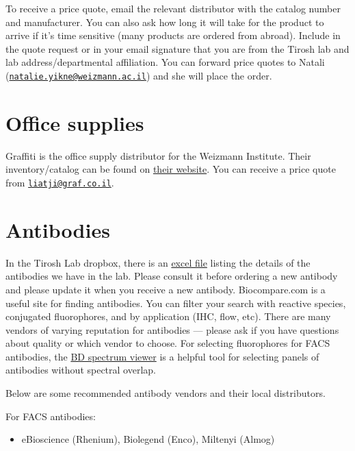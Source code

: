 \documentclass[]{book}
\providecommand{\tightlist}{%
  \setlength{\itemsep}{0pt}\setlength{\parskip}{0pt}}
\begin{document}
To receive a price quote, email the relevant distributor with the
catalog number and manufacturer. You can also ask how long it will take
for the product to arrive if it's time sensitive (many products are
ordered from abroad). Include in the quote request or in your email
signature that you are from the Tirosh lab and lab address/departmental
affiliation. You can forward price quotes to Natali
(\href{mailto:natalie.yikne@weizmann.ac.il}{\nolinkurl{natalie.yikne@weizmann.ac.il}})
and she will place the order.

\section{Office supplies}\label{office-supplies}

Graffiti is the office supply distributor for the Weizmann Institute.
Their inventory/catalog can be found on
\href{https://www.graffiti-online.co.il/}{their website}. You can
receive a price quote from
\href{mailto:liatji@graf.co.il}{\nolinkurl{liatji@graf.co.il}}.

\section{Antibodies}\label{antibodies}

In the Tirosh Lab dropbox, there is an
\href{https://www.dropbox.com/s/8fr2p795g5zgepz/antibodies_Tirosh.xlsx?dl=0}{excel
file} listing the details of the antibodies we have in the lab. Please
consult it before ordering a new antibody and please update it when you
receive a new antibody. Biocompare.com is a useful site for finding
antibodies. You can filter your search with reactive species, conjugated
fluorophores, and by application (IHC, flow, etc). There are many
vendors of varying reputation for antibodies --- please ask if you have
questions about quality or which vendor to choose. For selecting
fluorophores for FACS antibodies, the
\href{https://www.bdbiosciences.com/en-us/applications/research-applications/multicolor-flow-cytometry/product-selection-tools/spectrum-viewer}{BD
spectrum viewer} is a helpful tool for selecting panels of antibodies
without spectral overlap.

Below are some recommended antibody vendors and their local
distributors.

For FACS antibodies:

\begin{itemize}
\tightlist
\item
  eBioscience (Rhenium), Biolegend (Enco), Miltenyi (Almog)
\end{itemize}
\end{document}

